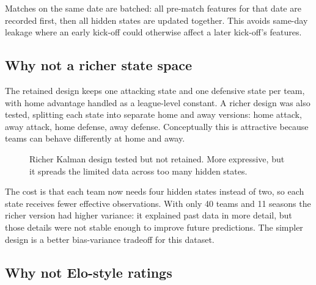 \documentclass[11pt]{article}
\begin{document}
Matches on the same date are batched: all pre-match features for that date are
recorded first, then all hidden states are updated together. This avoids
same-day leakage where an early kick-off could otherwise affect a later
kick-off's features.

\subsection{Why not a richer state space}

The retained design keeps one attacking state and one defensive state per team,
with home advantage handled as a league-level constant. A richer design was
also tested, splitting each state into separate home and away versions: home
attack, away attack, home defense, away defense. Conceptually this is
attractive because teams can behave differently at home and away.

\begin{figure}[h]
\centering
{}
\caption{Richer Kalman design tested but not retained. More expressive, but
it spreads the limited data across too many hidden states.}
\end{figure}

The cost is that each team now needs four hidden states instead of two, so each
state receives fewer effective observations. With only 40 teams and 11 seasons
the richer version had higher variance: it explained past data in more detail,
but those details were not stable enough to improve future predictions. The
simpler design is a better bias-variance tradeoff for this dataset.

\subsection{Why not Elo-style ratings}
\end{document}
